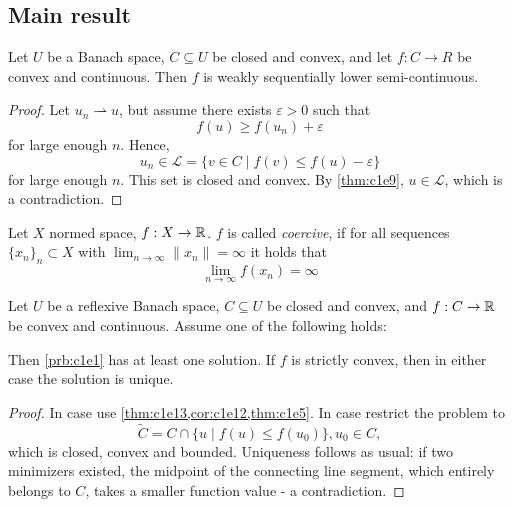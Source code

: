 \documentclass[../skript.tex]{subfiles}
\begin{document}
\subsection{Main result}
\begin{lemma} %
\label{thm:c1e13}
Let $U$ be a Banach space, $C \subseteq U$ be closed and convex, and let $f : C \to R$ be convex and continuous.
Then $f$ is weakly sequentially lower semi-continuous.
\end{lemma}
\begin{proof}
Let $u_n \rightharpoonup u$, but assume there exists $\varepsilon > 0$ such that
\[
	f(u) \geq f(u_n) + \varepsilon
\]
for large enough $n$.
Hence,
\[
	u_n \in \mathcal{L} = \{ v \in C \mid f(v) \leq f(u) - \varepsilon \}
\]
for large enough $n$.
This set is closed and convex.
By \cref{thm:c1e9}, $u \in \mathcal{L}$, which is a contradiction.
\end{proof}
\begin{definitionnonumb}
	Let $X$ normed space, $f:X\to\mathbb{R}$. $f$ is called \emph{coercive}, if for all sequences $\{x_n\}_n\subset X$ with $\lim_{n\to\infty}\|x_n\| = \infty$ it holds that  
	\[
		\lim_{n\to\infty} f(x_n) = \infty
	\]
\end{definitionnonumb}
\begin{theorem} %
\label{thm:c1e14}
Let $U$ be a reflexive Banach space, $C \subseteq U$ be closed and convex, and $f : C \to \mathbb{R}$ be convex and continuous. Assume one of the following holds:
Then \cref{prb:c1e1} has at least one solution. If $f$ is strictly convex, then in either case the solution is unique.
\end{theorem}
\begin{proof}
In case  use \cref{thm:c1e13,cor:c1e12,thm:c1e5}. In case  restrict the problem to
\[
	\tilde{C} = C \cap \{ u \mid f(u) \leq f(u_0) \}, u_0 \in C,
\]
which is closed, convex and bounded.
Uniqueness follows as usual: if two minimizers existed, the midpoint of the connecting line segment, which entirely belongs to $C$, takes a smaller function value - a contradiction.
\end{proof}
\end{document}
